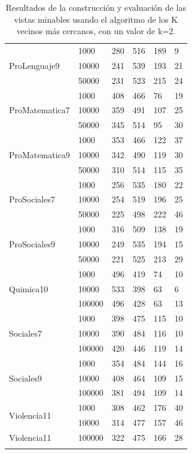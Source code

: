 \begin{longtable}{|p{3cm}|p{3cm}|p{2cm}|p{2cm}|p{2cm}|p{2cm}|}
\hline
\multirow{3}[6]{*}{ProLenguaje9} & 1000  & 280   & 516   & 189   & 9 \\
\cline{2-6}      & 10000 & 241   & 539   & 193   & 21 \\
\cline{2-6}      & 50000 & 231   & 523   & 215   & 24 \\
\hline
\multirow{3}[6]{*}{ProMatematica7} & 1000  & 408   & 466   & 76    & 19 \\
\cline{2-6}      & 10000 & 359   & 491   & 107   & 25 \\
\cline{2-6}      & 50000 & 345   & 514   & 95    & 30 \\
\hline
\multirow{3}[6]{*}{ProMatematica9} & 1000  & 353   & 466   & 122   & 37 \\
\cline{2-6}      & 10000 & 342   & 490   & 119   & 30 \\
\cline{2-6}      & 50000 & 310   & 514   & 115   & 35 \\
\hline
\multirow{3}[6]{*}{ProSociales7} & 1000  & 256   & 535   & 180   & 22 \\
\cline{2-6}      & 10000 & 254   & 519   & 196   & 25 \\
\cline{2-6}      & 50000 & 225   & 498   & 222   & 46 \\
\hline
\multirow{3}[6]{*}{ProSociales9} & 1000  & 316   & 509   & 138   & 19 \\
\cline{2-6}      & 10000 & 249   & 535   & 194   & 15 \\
\cline{2-6}      & 50000 & 221   & 525   & 213   & 29 \\
\hline
\multirow{3}[6]{*}{Quimica10} & 1000  & 496   & 419   & 74    & 10 \\
\cline{2-6}      & 10000 & 533   & 398   & 63    & 6 \\
\cline{2-6}      & 100000 & 496   & 428   & 63    & 13 \\
\hline
\multirow{3}[6]{*}{Sociales7} & 1000  & 398   & 475   & 115   & 10 \\
\cline{2-6}      & 10000 & 390   & 484   & 116   & 10 \\
\cline{2-6}      & 100000 & 420   & 446   & 119   & 14 \\
\hline
\multirow{3}[6]{*}{Sociales9} & 1000  & 354   & 484   & 144   & 16 \\
\cline{2-6}      & 10000 & 408   & 464   & 109   & 15 \\
\cline{2-6}      & 100000 & 381   & 494   & 109   & 14 \\
\hline
\multirow{2}[6]{*}{Violencia11} & 1000  & 308   & 462   & 176   & 40 \\
\cline{2-6}      & 10000 & 314   & 477   & 157   & 46 \\
Violencia11      & 100000 & 322   & 475   & 166   & 28 \\
\hline
\caption{Resultados de la construcción y evaluación de las vistas minables usando el algoritmo de los K vecinos más cercanos, con un valor de k=2.}
\label{tab:cuadro35}
\end{longtable}
